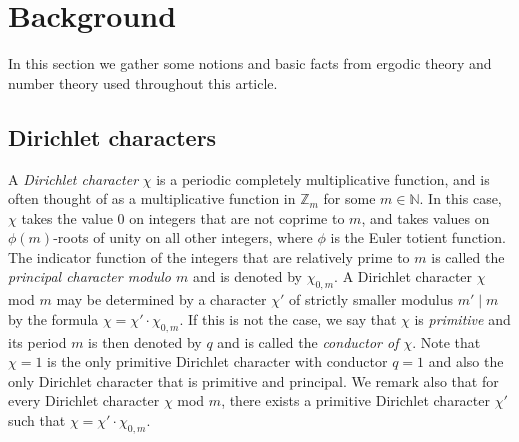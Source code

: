 \documentclass[11pt]{amsart}
\theoremstyle{definition}
\newcommand{\N}{{\mathbb N}}
\renewcommand{\S}{\mathbb{S}}
\newcommand{\Z}{{\mathbb Z}}
\begin{document}





\section{Background}\label{S:Background}
In this section we gather some notions and basic facts from ergodic theory and number theory used throughout this article.

\subsection{Dirichlet characters}
 A {\em Dirichlet character} $\chi$  is a periodic completely multiplicative function, and is often thought of as a multiplicative function in $\Z_m$ for some $m\in \N$. In this case, 
$\chi$  takes the value $0$ on integers that are not coprime to $m$, and
takes values on $\phi(m)$-roots of unity on all other integers, where $\phi$ is the Euler totient function.  The indicator function of the integers that are relatively prime to $m$ is called the {\em principal character modulo $m$} and is denoted by $\chi_{0,m}$.  A Dirichlet character $\chi$ mod $m$ may be determined by a character $\chi'$ of strictly smaller modulus $m'\mid m$ by the formula $\chi=\chi'\cdot \chi_{0,m}$. If this is not the case, we say that $\chi$ is {\em primitive} and its period $m$ is then denoted by $q$ and is called the {\em conductor of $\chi$}.  Note that $\chi=1$ is the only primitive Dirichlet character with conductor $q=1$ and also the only Dirichlet character that is primitive and principal. We remark also that for every Dirichlet character $\chi$ mod $m$, there exists a primitive Dirichlet character $\chi'$ such that $\chi=\chi'\cdot \chi_{0,m}$.
\end{document}
